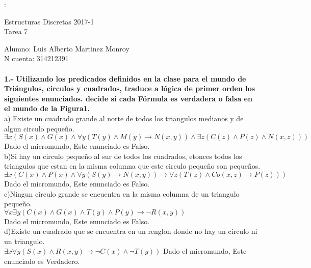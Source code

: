 \documentclass[paper=letter, fontsize=12pt]{scrartcl}
\begin{document}
\parindent=0mm:
	\begin{center}
  Estructuras Discretas 2017-1\\
  Tarea 7\\
\end{center}

Alumno: Luis Alberto Martinez Monroy\\
N cuenta: 314212391\\ \\
{\bf 1.- Utilizando los predicados definidos en la clase  para el mundo de Triángulos, circulos y cuadrados, traduce a lógica de primer orden los siguientes enunciados. decide si cada Fórmula es verdadera o falsa en el mundo de la Figura1.}\\
a) Existe un cuadrado grande al norte de todos los triangulos medianos y de algun circulo pequeño.\\

$\exists x(S(x)\wedge G(x) \wedge \forall y(T(y)\wedge M(y)\rightarrow N(x,y) )\wedge \exists z(C(z)\wedge P(z)\wedge N(x,z)))$\\ 
Dado el micromundo, Este enunciado es Falso.\\

b)Si hay un circulo pequeño al sur de todos los cuadrados, etonces todos los triangulos que estan en la misma columna que este circulo pequeño son pequeños.\\
$\exists x(C(x)\wedge P(x)\wedge\forall y(S(y)\rightarrow N(x,y))\rightarrow \forall z(T(z)\wedge Co(x,z)\rightarrow P(z)))$\\
Dado el micromundo, Este enunciado es Falso.\\

c)Ningun circulo grande se encuentra en la misma columna de un triangulo pequeño.\\
$\forall x \exists y(C(x)\wedge G(x)\wedge T(y)\wedge P(y)\rightarrow \neg R(x,y))$\\
Dado el micromundo, Este enunciado es Falso.\\


d)Existe un cuadrado que se encuentra en un renglon donde no hay un circulo ni un triangulo.\\
$\exists x\forall y(S(x)\wedge R(x,y)\rightarrow \neg C(x)\wedge\neg T(y) ) $
Dado el micromundo, Este enunciado es Verdadero.\\
 
\end{document}
